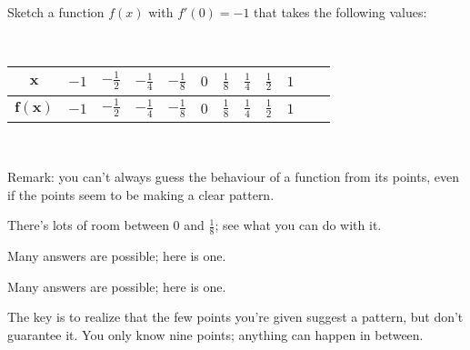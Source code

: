 \begin{Mquestion}
Sketch a function $f(x)$ with $f'(0)=-1$ that takes the following values:

~\begin{center}
\begin{tabular}{|c|c|c|c|c|c|c|c|c|c|c|c|}
\hline
$\mathbf{x}$&$-1$&$-\frac{1^{ }}{2_{ }}$&$-\frac{1}{4}$&$-\frac{1}{8}$
&$0$
&$\frac{1}{8}$&$\frac{1}{4}$&$\frac{1}{2}$&$1$\\
\hline
$\mathbf{f(x)}$&$-1$&$-\frac{1^{ }}{2_{ }}$&$-\frac{1}{4}$&$-\frac{1}{8}$
&$0$
&$\frac{1}{8}$&$\frac{1}{4}$&$\frac{1}{2}$&$1$\\ \hline
\end{tabular}\end{center}~

Remark: you can't always guess the behaviour of a function from its points, even if the points seem to be making a clear pattern.
\end{Mquestion}
\begin{hint} There's lots of room between $0$ and $\frac{1}{8}$; see what you can do with it.
\end{hint}
\begin{answer} Many answers are possible; here is one.
\begin{center}
\end{center}
\end{answer}
\begin{solution}
Many answers are possible; here is one.
\begin{center}
\end{center}
The key is to realize that the few points you're given suggest a pattern, but don't guarantee it. You only know nine points; anything can happen in between.
\end{solution}




